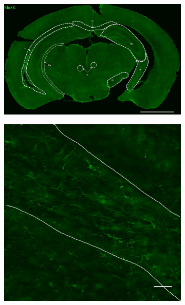 	\begin{figure}[h] %
		\begin{subfigure}[h]{0.99\textwidth}
			\caption{}
			\label{fig:locaMusK}
			\includegraphics[width=\textwidth]{./Images/Immuno/Musk/loca_MuSK.jpg}
		\end{subfigure}
		\begin{subfigure}[h]{0.245\textwidth}
			\caption{}
			\label{fig:locaMuSKcc}
			\includegraphics[width=\textwidth]{./Images/Immuno/Musk/MuSK_cc_50um.jpg}
		\end{subfigure}

\end{figure}
